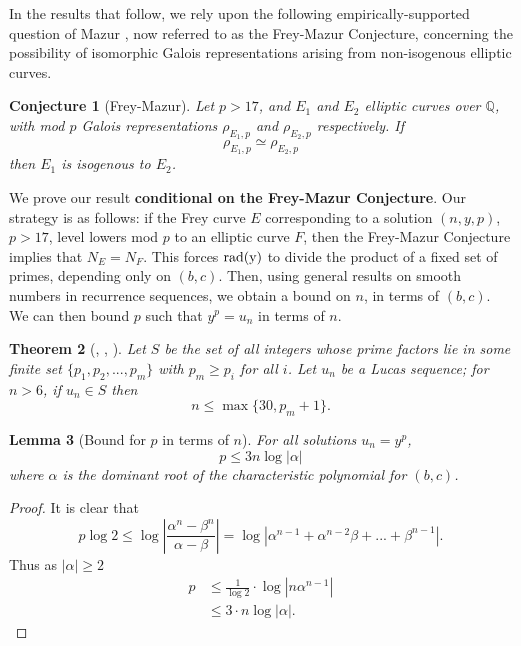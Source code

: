 \documentclass[12pt]{amsart}
\newtheorem{thm}{Theorem}[section]
\newtheorem{lem}[thm]{Lemma}
\newtheorem{conj}[thm]{Conjecture}
\theoremstyle{definition}
\def\Q{{\mathbb Q}}
\newcommand{\rad}{\rm rad}
\newcommand{\bfrac}[2]{\left| \frac{#1}{#2} \right|}
\begin{document}
In the results that follow, we rely upon the following empirically-supported question of Mazur \cite{mazur78}, now referred to as the Frey-Mazur Conjecture, concerning the possibility of isomorphic Galois representations arising from non-isogenous elliptic curves.

\begin{conj}[Frey-Mazur]\label{FreyMazur}
Let $p > 17$, and $E_1$ and $E_2$ elliptic curves over $\Q$, with mod $p$ Galois representations $\rho_{E_1,p}$ and $\rho_{E_2,p}$ respectively.  If
\[ \rho_{E_1,p} \simeq \rho_{E_2,p} \]
then $E_1$ is isogenous to $E_2$.
\end{conj}

We prove our result \textbf{conditional on the Frey-Mazur Conjecture}. Our strategy is as follows: if the Frey curve $E$ corresponding to a solution $(n,y,p)$, $p > 17$, level lowers mod $p$ to an elliptic curve $F$, then the Frey-Mazur Conjecture implies that $N_E = N_F$. This forces $\rad(y)$ to divide the product of a fixed set of primes, depending only on $(b,c)$. Then, using general results on smooth numbers in recurrence sequences, we obtain a bound on $n$, in terms of $(b,c)$. We can then bound $p$ such that $y^p = u_n$ in terms of $n$.


\begin{thm}[\cite{gyory81}, \cite{gyory82}, \cite{gyory03}]\label{smoothterm}
Let $S$ be the set of all integers whose prime factors lie in some finite set $\{p_1,p_2,...,p_m\}$ with $p_m \geq p_i$ for all $i$.  Let $u_n$ be a Lucas sequence; for $n > 6$, if $u_n \in S$ then
\[ n \leq \max\{30, p_m +1 \}. \]
\end{thm}

\begin{lem}[Bound for $p$ in terms of $n$]\label{boundpintermsn}
For all solutions $u_n = y^p$, 
\[ p \leq 3n \log|\alpha|  \]
where $\alpha$ is the dominant root of the characteristic polynomial for $(b,c)$.
\end{lem}

\begin{proof}
It is clear that
\[p\log{2} \leq \log \bfrac{\alpha^n - \beta^n}{\alpha-\beta}  = \log|\alpha^{n-1}+ \alpha^{n-2}\beta+...+\beta^{n-1}|. \]
Thus as $|\alpha| \geq 2$
\begin{align*}
p & \leq  \frac{1}{\log{2}} \cdot \log|n\alpha^{n-1}| \\
 & \leq 3\cdot n \log|\alpha|.
\end{align*}
\end{proof}
\end{document}
